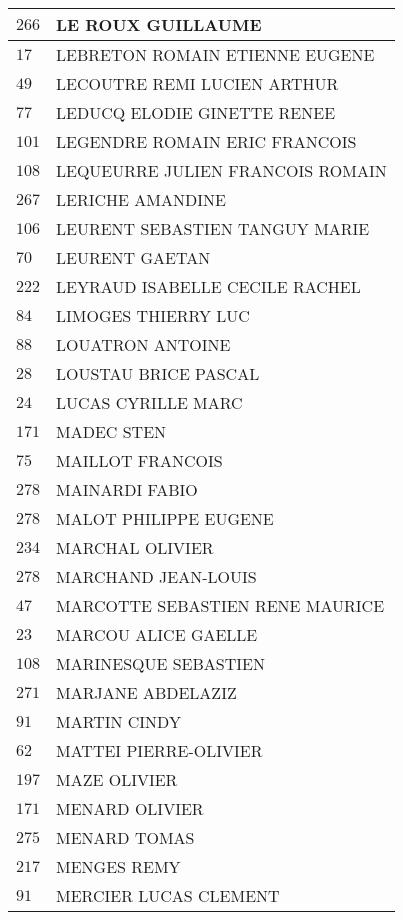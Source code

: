 \begin{xltabular}{\linewidth}{|l|X|}
    \hline
    $266$ & LE ROUX GUILLAUME \\
    \hline
    $17$ & LEBRETON ROMAIN ETIENNE EUGENE \\
    \hline
    $49$ & LECOUTRE REMI LUCIEN ARTHUR \\
    \hline
    $77$ & LEDUCQ ELODIE GINETTE RENEE \\
    \hline
    $101$ & LEGENDRE ROMAIN ERIC FRANCOIS \\
    \hline
    $108$ & LEQUEURRE JULIEN FRANCOIS ROMAIN \\
    \hline
    $267$ & LERICHE AMANDINE \\
    \hline
    $106$ & LEURENT SEBASTIEN TANGUY MARIE \\
    \hline
    $70$ & LEURENT GAETAN \\
    \hline
    $222$ & LEYRAUD ISABELLE CECILE RACHEL \\
    \hline
    $84$ & LIMOGES THIERRY LUC \\
    \hline
    $88$ & LOUATRON ANTOINE \\
    \hline
    $28$ & LOUSTAU BRICE PASCAL \\
    \hline
    $24$ & LUCAS CYRILLE MARC \\
    \hline
    $171$ & MADEC STEN \\
    \hline
    $75$ & MAILLOT FRANCOIS \\
    \hline
    $278$ & MAINARDI FABIO \\
    \hline
    $278$ & MALOT PHILIPPE EUGENE \\
    \hline
    $234$ & MARCHAL OLIVIER \\
    \hline
    $278$ & MARCHAND JEAN-LOUIS \\
    \hline
    $47$ & MARCOTTE SEBASTIEN RENE MAURICE \\
    \hline
    $23$ & MARCOU ALICE GAELLE \\
    \hline
    $108$ & MARINESQUE SEBASTIEN \\
    \hline
    $271$ & MARJANE ABDELAZIZ \\
    \hline
    $91$ & MARTIN CINDY \\
    \hline
    $62$ & MATTEI PIERRE-OLIVIER \\
    \hline
    $197$ & MAZE OLIVIER \\
    \hline
    $171$ & MENARD OLIVIER \\
    \hline
    $275$ & MENARD TOMAS \\
    \hline
    $217$ & MENGES REMY \\
    \hline
    $91$ & MERCIER LUCAS CLEMENT \\

\end{xltabular}
